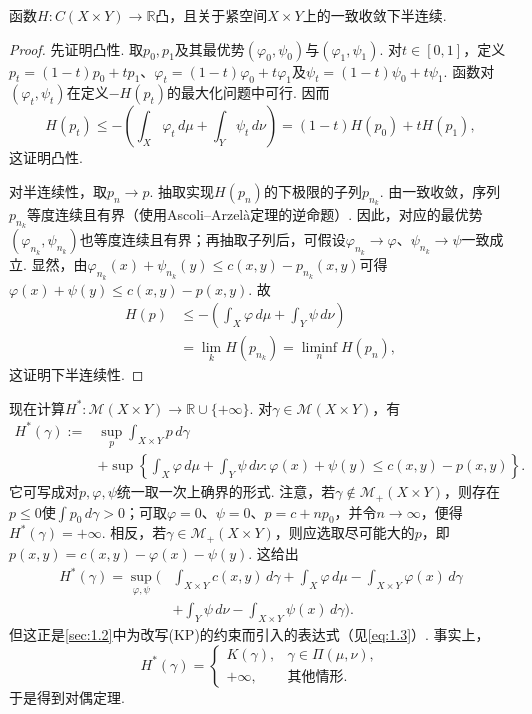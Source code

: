 \begin{lemma}\label{obj:1.45}
函数$H:C(X\times Y)\to\mathbb R$凸，且关于紧空间$X\times Y$上的一致收敛下半连续.
\end{lemma}
\begin{proof}
先证明凸性. 取$p_0,p_1$及其最优势$(\varphi_0,\psi_0)$与$(\varphi_1,\psi_1)$. 对$t\in[0,1]$，定义$p_t=(1-t)p_0+tp_1$、$\varphi_t=(1-t)\varphi_0+t\varphi_1$及$\psi_t=(1-t)\psi_0+t\psi_1$. 函数对$(\varphi_t,\psi_t)$在定义$-H(p_t)$的最大化问题中可行. 因而
\[
H(p_t)\le-\left(\int_X\varphi_t\,d\mu+\int_Y\psi_t\,d\nu\right)
=(1-t)H(p_0)+tH(p_1),
\]
这证明凸性.

对半连续性，取$p_n\to p$. 抽取实现$H(p_n)$的下极限的子列$p_{n_k}$. 由一致收敛，序列$p_{n_k}$等度连续且有界（使用Ascoli--Arzel\`a定理的逆命题）. 因此，对应的最优势$(\varphi_{n_k},\psi_{n_k})$也等度连续且有界；再抽取子列后，可假设$\varphi_{n_k}\to\varphi$、$\psi_{n_k}\to\psi$一致成立. 显然，由$\varphi_{n_k}(x)+\psi_{n_k}(y)\le c(x,y)-p_{n_k}(x,y)$可得$\varphi(x)+\psi(y)\le c(x,y)-p(x,y)$. 故
\begin{equation*}
\begin{aligned}
H(p)&\le-\left(\int_X\varphi\,d\mu+\int_Y\psi\,d\nu\right)\\
&=\lim_k H(p_{n_k})=\liminf_n H(p_n),
\end{aligned}
\end{equation*}
这证明下半连续性.
\end{proof}

现在计算$H^*:\mathscr M(X\times Y)\to\mathbb R\cup\{+\infty\}$. 对$\gamma\in\mathscr M(X\times Y)$，有
\begin{equation*}
\begin{aligned}
H^*(\gamma):={}&\sup_p\int_{X\times Y}p\,d\gamma\\
&+\sup\left\{\int_X\varphi\,d\mu+\int_Y\psi\,d\nu:
\varphi(x)+\psi(y)\le c(x,y)-p(x,y)\right\}.
\end{aligned}
\end{equation*}
它可写成对$p,\varphi,\psi$统一取一次上确界的形式. 注意，若$\gamma\notin\mathscr M_+(X\times Y)$，则存在$p\le0$使$\int p_0\,d\gamma>0$；可取$\varphi=0$、$\psi=0$、$p=c+np_0$，并令$n\to\infty$，便得$H^*(\gamma)=+\infty$. 相反，若$\gamma\in\mathscr M_+(X\times Y)$，则应选取尽可能大的$p$，即$p(x,y)=c(x,y)-\varphi(x)-\psi(y)$. 这给出
\begin{equation*}
\begin{aligned}
H^*(\gamma)=\sup_{\varphi,\psi}\biggl(&\int_{X\times Y}c(x,y)\,d\gamma
+\int_X\varphi\,d\mu-\int_{X\times Y}\varphi(x)\,d\gamma\\
&+\int_Y\psi\,d\nu-\int_{X\times Y}\psi(x)\,d\gamma\biggr).
\end{aligned}
\end{equation*}
但这正是\autoref{sec:1.2}中为改写(KP)的约束而引入的表达式（见\eqref{eq:1.3}）. 事实上，
\[
H^*(\gamma)=\begin{cases}
K(\gamma),&\gamma\in\Pi(\mu,\nu),\\
+\infty,&\text{其他情形}.
\end{cases}
\]
于是得到对偶定理.

